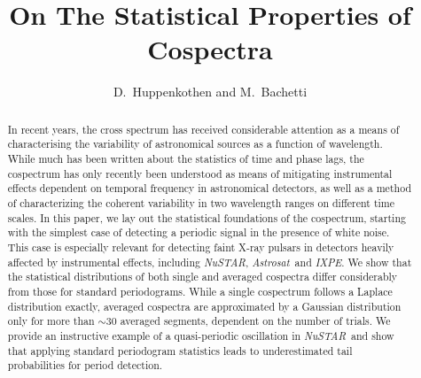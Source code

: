 \documentclass[12pt]{emulateapj}
\newcommand{\project}[1]{\textsl{#1}}
\newcommand{\nustar}{\project{NuSTAR}\xspace}
\newcommand{\astrosat}{\project{Astrosat}\xspace}
\newcommand{\ixpe}{\project{IXPE}\xspace}
\begin{document}
\title[On The Statistical Properties of Cospectra]{On The Statistical Properties of Cospectra}

\author{D.~Huppenkothen and M.~Bachetti}



\begin{abstract}
In recent years, the cross spectrum has received considerable attention as a means of characterising the variability of astronomical sources as a function of wavelength. While much has been written about the statistics of time and phase lags, the cospectrum has only recently been understood as means of mitigating instrumental effects dependent on temporal frequency in astronomical detectors, as well as a method of characterizing the coherent variability in two  wavelength ranges on different time scales. In this paper, we lay out the statistical foundations of the cospectrum, starting with the simplest case of detecting a periodic signal in the presence of white noise. This case is especially relevant for detecting faint X-ray pulsars in detectors heavily affected by instrumental effects, including \nustar, \astrosat\ and \ixpe. We show that the statistical distributions of both single and averaged cospectra differ considerably from those for standard periodograms. While a single cospectrum follows a Laplace distribution exactly, averaged cospectra are approximated by a Gaussian distribution only for more than $\sim\!\! 30$ averaged segments, dependent on the number of trials. We provide an instructive example of a quasi-periodic oscillation in \nustar\ and show that applying standard periodogram statistics leads to underestimated tail probabilities for period detection.

\end{abstract}
\end{document}
